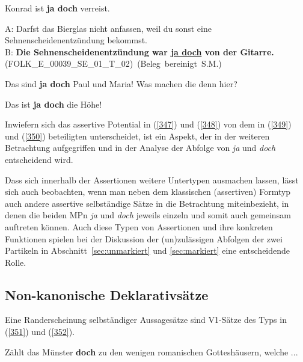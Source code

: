 \begin{exe}
	\ex\label{347} 
	Konrad ist \textbf{ja doch} verreist.	
\end{exe}

\begin{exe}
	\ex\label{348} 

	A: Darfst das Bierglas nicht anfassen, weil du sonst eine Sehnenscheidenentzündung bekommst.\\
	B: \textbf{Die Sehnenscheidenentzündung war \underline{ja doch} von der Gitarre.}
	\newline
	\hbox{}\hfill\hbox{\textsc{(FOLK\_E\_00039\_SE\_01\_T\_02)} (Beleg bereinigt S.M.)}	
\end{exe}

\begin{exe}
	\ex\label{349} 
	Das sind \textbf{ja doch} Paul und Maria! Was machen die denn hier?	
\end{exe}		

\begin{exe}
	\ex\label{350} 
	Das ist \textbf{ja doch} die Höhe!
\end{exe}	
Inwiefern sich das assertive Potential in (\ref{347}) und (\ref{348}) von dem in (\ref{349}) und (\ref{350}) beteiligten unterscheidet, ist ein Aspekt, der in der weiteren Betrachtung aufgegriffen und in der Analyse der Abfolge von \textit{ja} und \textit{doch} entscheidend wird. 

Dass sich innerhalb der Assertionen weitere Untertypen ausmachen lassen, lässt sich auch beobachten, wenn man neben dem klassischen (assertiven) Formtyp auch andere assertive selbständige Sätze in die Betrachtung miteinbezieht, in denen die beiden MPn \textit{ja} und \textit{doch} jeweils einzeln und somit auch gemeinsam auftreten können. Auch diese Typen von Assertionen und ihre konkreten Funktionen spielen bei der Diskussion der (un)zulässigen Abfolgen der zwei Partikeln in Abschnitt~\ref{sec:unmarkiert} und \ref{sec:markiert} eine entscheidende Rolle.
				  
\subsection{Non-kanonische Deklarativsätze}
\label{sec:nonkan}
Eine Randerscheinung selbständiger Aussagesätze sind V1-Sätze des Typs in (\ref{351}) und (\ref{352}).

\begin{exe}
	\ex\label{351} 
	Zählt das Münster \textbf{doch} zu den wenigen romanischen Gotteshäusern, welche ...
	\hfill\hbox{\citet[294]{Oennerfors1997}}	
\end{exe}

